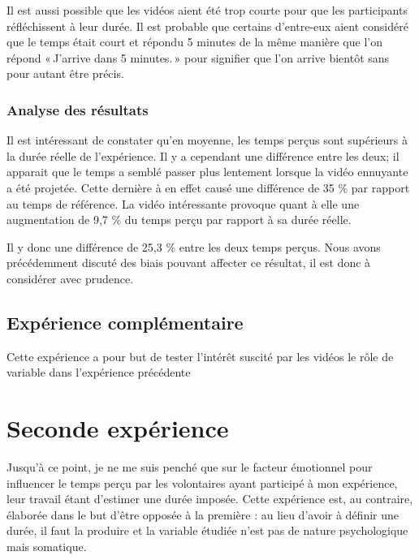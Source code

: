 \documentclass[12pt,fleqn,oneside,openany]{book} %
\begin{document}
Il est aussi possible que les vidéos aient été trop courte pour que les participants réfléchissent à leur durée. Il est probable que certains d'entre-eux aient considéré que le temps était court et répondu 5 minutes de la même manière que l'on répond «\,J'arrive dans 5 minutes.\,» pour signifier que l'on arrive bientôt sans pour autant être précis.



\subsubsection{Analyse des résultats} \label{sssec:analyseResult1.1}
Il est intéressant de constater qu'en moyenne, les temps perçus sont supérieurs à la durée réelle de l'expérience. Il y a cependant une différence entre les deux; il apparait que le temps a semblé passer plus lentement lorsque la vidéo ennuyante a été projetée. Cette dernière à en effet causé une différence de 35 \% par rapport au temps de référence. La vidéo intéressante provoque quant à elle une augmentation de 9,7 \% du temps perçu par rapport à sa durée réelle.

Il y donc une différence de 25,3 \% entre les deux temps perçus. Nous avons précédemment discuté des biais pouvant affecter ce résultat, il est donc à considérer avec prudence. 

\subsection{Expérience complémentaire} \label{ssec:exp2.2}
Cette expérience a pour but de tester l'intérêt suscité par les vidéos le rôle de variable dans l'expérience précédente

\newpage
\section{Seconde expérience} \label{sec:exp2}
Jusqu'à ce point, je ne me suis penché que sur le facteur émotionnel pour influencer le temps perçu par les volontaires ayant participé à mon expérience, leur travail étant d'estimer une durée imposée. Cette expérience est, au contraire, élaborée dans le but d'être opposée à la première : au lieu d'avoir à définir une durée, il faut la produire et la variable étudiée n'est pas de nature psychologique mais somatique.
\end{document}
